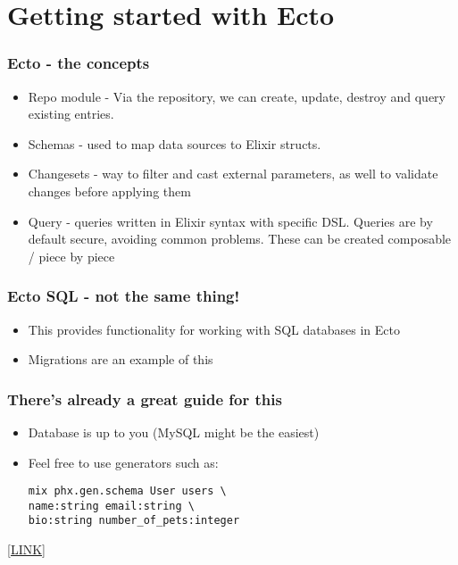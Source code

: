 \section{Getting started with Ecto}

\frame{\tableofcontents[currentsection]}

\begin{frame}
    \frametitle{Ecto - the concepts}

    \begin{itemize}
        \item Repo module - Via the repository, we can create, update, destroy and query existing entries.
        \item Schemas - used  to map data sources to Elixir structs.
        \item Changesets - way to filter and cast external parameters, as well to validate changes before applying them
        \item Query - queries written in Elixir syntax with specific DSL. Queries are by default secure, avoiding common problems. These can be created composable / piece by piece
    \end{itemize}
\end{frame}

\begin{frame}
    \frametitle{Ecto SQL - not the same thing!}

    \begin{itemize}
        \item This provides functionality for working with SQL databases in Ecto
        \item Migrations are an example of this
    \end{itemize}
\end{frame}

\begin{frame}[fragile]
    \frametitle{There's already a great guide for this}

    \begin{itemize}
        \item Database is up to you (MySQL might be the easiest)
        \item Feel free to use generators such as:
        \begin{verbatim}
mix phx.gen.schema User users \ 
name:string email:string \
bio:string number_of_pets:integer
        \end{verbatim}
    \end{itemize}

    \vfill

    \href{https://hexdocs.pm/phoenix/ecto.html\#content}{[LINK]}
\end{frame}